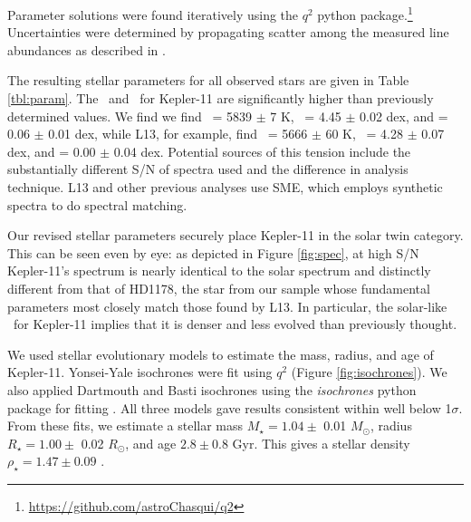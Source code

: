 \documentclass[oneside]{emulateapj}
\begin{document}
Parameter solutions were found iteratively using the $q^2$ python package.\footnote{\url{https://github.com/astroChasqui/q2}} Uncertainties were determined by propagating scatter among the measured line abundances as described in \citet{Epstein2010, Bensby2014}.

The resulting stellar parameters for all observed stars are given in Table \ref{tbl:param}. The \teff\ and \logg\ for Kepler-11 are significantly higher than previously determined values. We find we find \teff\ = 5839 $\pm$ 7 K, \logg\ = 4.45 $\pm$ 0.02 dex, and \feh = 0.06 $\pm$ 0.01 dex, while L13, for example, find \teff\ = 5666 $\pm$ 60 K, \logg\ = 4.28 $\pm$ 0.07 dex, and \feh = 0.00 $\pm$ 0.04 dex. Potential sources of this tension include the substantially different S/N of spectra used and the difference in analysis technique. L13 and other previous analyses use SME, which employs synthetic spectra to do spectral matching. 

Our revised stellar parameters securely place Kepler-11 in the solar twin category. This can be seen even by eye: as depicted in Figure \ref{fig:spec}, at high S/N Kepler-11's spectrum is nearly identical to the solar spectrum and distinctly different from that of HD1178, the star from our sample whose fundamental parameters most closely match those found by L13. In particular, the solar-like \logg\ for Kepler-11 implies that it is denser and less evolved than previously thought.

We used stellar evolutionary models to estimate the mass, radius, and age of Kepler-11. Yonsei-Yale isochrones were fit using $q^2$ (Figure \ref{fig:isochrones}). We also applied Dartmouth and Basti isochrones using the \textit{isochrones} python package for fitting \citep{Morton2015}. All three models gave results consistent within well below 1$\sigma$. From these fits, we estimate a stellar mass $M_{\star} = 1.04 \pm$ 0.01 $M_{\odot}$, radius $R_{\star} = 1.00 \pm$ 0.02 $R_{\odot}$, and age $2.8 \pm 0.8$ Gyr. This gives a stellar density $\rho_{\star} = 1.47 \pm 0.09$ \gcm.
\end{document}
